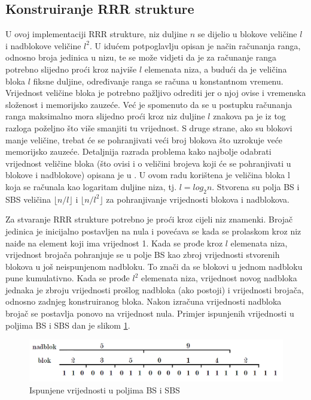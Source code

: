 \subsection{Konstruiranje RRR strukture}
U ovoj implementaciji RRR strukture, niz duljine $n$ se dijelio u blokove veličine $l$ i nadblokove veličine $l^2$. U idućem potpoglavlju opisan je način računanja ranga, odnosno broja jedinica u nizu, te se može vidjeti da je za računanje ranga potrebno slijedno proći kroz najviše $l$ elemenata niza, a budući da je veličina bloka $l$ fiksne duljine, određivanje ranga se računa u konstantnom vremenu. Vrijednost veličine bloka je potrebno pažljivo odrediti jer o njoj ovise i vremenska složenost i memorijsko zauzeće. Već je spomenuto da se u postupku računanja ranga maksimalno mora slijedno proći kroz niz duljine $l$ znakova pa je iz tog razloga poželjno što više smanjiti tu vrijednost. S druge strane, ako su blokovi manje veličine, trebat će se pohranjivati veći broj blokova što uzrokuje veće memorijsko zauzeće. Detaljnija razrada problema kako najbolje odabrati vrijednost veličine bloka (što ovisi i o veličini brojeva koji će se pohranjivati u blokove i nadblokove) opisana je u \cite{fm3}. U ovom radu korištena je veličina bloka l koja se računala kao logaritam duljine niza, tj. $l=log_2 n$. Stvorena su polja BS i SBS veličina 
$\lfloor n/l \rfloor$ i $\lfloor n/l^{2} \rfloor$ za pohranjivanje vrijednosti blokova i nadblokova. 

Za stvaranje RRR strukture potrebno je proći kroz cijeli niz znamenki. Brojač jedinica je inicijalno postavljen na nula i povećava se kada se prolaskom kroz niz naiđe na element koji ima vrijednost 1. Kada se prođe kroz $l$ elemenata niza, vrijednost brojača pohranjuje se u polje BS kao zbroj vrijednosti stvorenih blokova u još neispunjenom nadbloku. To znači da se blokovi u jednom nadbloku pune kumulativno. Kada se prođe $l^2$ elemenata niza, vrijednost novog nadbloka jednaka je zbroju vrijednosti prošlog nadbloka (ako postoji) i vrijednosti brojača, odnosno zadnjeg konstruiranog bloka. Nakon izračuna vrijednosti nadbloka brojač se postavlja ponovo na vrijednost nula. Primjer ispunjenih vrijednosti u poljima BS i SBS dan je slikom \ref{rrr1}.

\begin{figure}[H]
\centering
\includegraphics[width=\linewidth]{./pictures/rrr1.png}
\caption{Ispunjene vrijednosti u poljima BS i SBS}\label{rrr1}
\end{figure}

